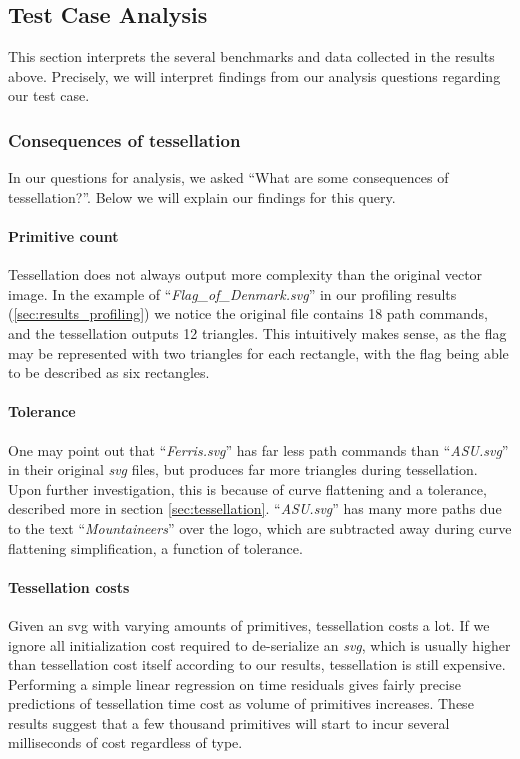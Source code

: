 

\subsection{Test Case Analysis}
This section interprets the several benchmarks and data collected in the results above. Precisely, we will interpret findings from our analysis questions regarding our test case.\medskip

\subsubsection{Consequences of tessellation}
In our questions for analysis, we asked ``What are some consequences of tessellation?''. Below we will explain our findings for this query.\medskip

\paragraph{Primitive count} Tessellation does not always output more complexity than the original vector image. In the example of ``\textit{Flag\_of\_Denmark.svg}'' in our profiling results (\cref{sec:results_profiling}) we notice the original file contains 18 path commands, and the tessellation outputs 12 triangles. This intuitively makes sense, as the flag may be represented with two triangles for each rectangle, with the flag being able to be described as six rectangles.

\paragraph{Tolerance} One may point out that ``\textit{Ferris.svg}'' has far less path commands than ``\textit{ASU.svg}'' in their original \textit{svg} files, but produces far more triangles during tessellation. Upon further investigation, this is because of curve flattening and a tolerance, described more in section \cref{sec:tessellation}. ``\textit{ASU.svg}'' has many more paths due to the text ``\textit{Mountaineers}'' over the logo, which are subtracted away during curve flattening simplification, a function of tolerance.

\paragraph{Tessellation costs} Given an svg with varying amounts of primitives, tessellation costs a lot. If we ignore all initialization cost required to de-serialize an \textit{svg}, which is usually higher than tessellation cost itself according to our results, tessellation is still expensive. Performing a simple linear regression on time residuals gives fairly precise predictions of tessellation time cost as volume of primitives increases. These results suggest that a few thousand primitives will start to incur several milliseconds of cost regardless of type.


